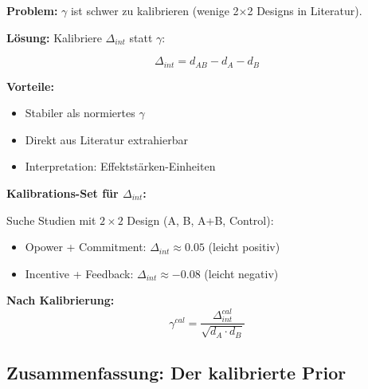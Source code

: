 \begin{tcolorbox}[colback=orange!5!white, colframe=orange!75!black,
    title=\textbf{$\gamma$-Kalibrierung über $\Delta_{int}$}]

\textbf{Problem:} $\gamma$ ist schwer zu kalibrieren (wenige 2×2 Designs in Literatur).

\textbf{Lösung:} Kalibriere $\Delta_{int}$ statt $\gamma$:

\begin{equation}
\Delta_{int} = d_{AB} - d_A - d_B
\end{equation}

\textbf{Vorteile:}
\begin{itemize}[nosep]
    \item Stabiler als normiertes $\gamma$
    \item Direkt aus Literatur extrahierbar
    \item Interpretation: Effektstärken-Einheiten
\end{itemize}

\textbf{Kalibrations-Set für $\Delta_{int}$:}

Suche Studien mit $2 \times 2$ Design (A, B, A+B, Control):
\begin{itemize}[nosep]
    \item Opower + Commitment: $\Delta_{int} \approx 0.05$ (leicht positiv)
    \item Incentive + Feedback: $\Delta_{int} \approx -0.08$ (leicht negativ)
\end{itemize}

\textbf{Nach Kalibrierung:}
\begin{equation}
\gamma^{cal} = \frac{\Delta_{int}^{cal}}{\sqrt{d_A \cdot d_B}}
\end{equation}

\end{tcolorbox}

\subsection{Zusammenfassung: Der kalibrierte Prior}

